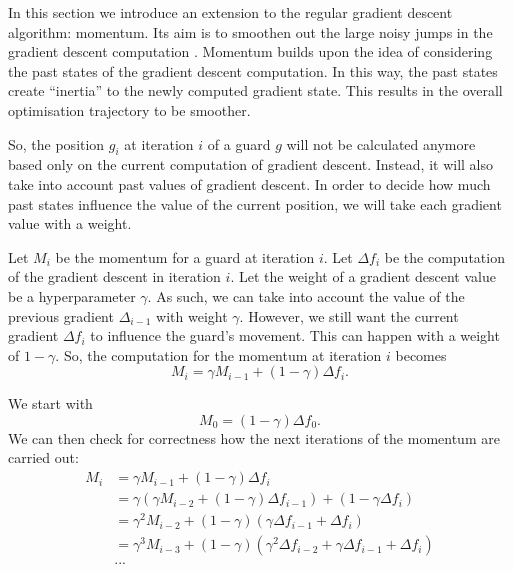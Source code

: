 In this section we introduce an extension to the regular gradient descent algorithm: momentum. Its aim is to smoothen out the large noisy jumps in the gradient descent computation \cite{goodfelow2016deep}. Momentum builds upon the idea of considering the past states of the gradient descent computation. In this way, the past states create ``inertia'' to the newly computed gradient state. This results in the overall optimisation trajectory to be smoother.

So, the position $g_i$ at iteration $i$ of a guard $g$ will not be calculated anymore based only on the current computation of gradient descent. Instead, it will also take into account past values of gradient descent. In order to decide how much past states influence the value of the current position, we will take each gradient value with a weight.

Let $M_i$ be the momentum for a guard at iteration $i$. Let $\Delta f_i$ be the computation of the gradient descent in iteration $i$. Let the weight of a gradient descent value be a hyperparameter $\gamma$. 
As such, we can take into account the value of the previous gradient $\Delta_{i - 1}$ with weight $\gamma$. However, we still want the current gradient $\Delta f_i$ to influence the guard's movement. This can happen with a weight of $1 - \gamma$. So, the computation for the momentum at iteration $i$ becomes $$M_i = \gamma M_{i - 1} + (1 - \gamma)\Delta f_i.$$

We start with $$M_0 = (1 - \gamma) \Delta f_0.$$
We can then check for correctness how  the next iterations of the momentum are carried out:
\begin{align*}
    M_i &= \gamma M_{i - 1} + (1 - \gamma) \Delta f_i \\
        &= \gamma (\gamma M_{i - 2} + (1 - \gamma) \Delta f_{i - 1}) + (1 - \gamma \Delta f_i) \\ 
        &= \gamma^2 M_{i - 2} + (1 - \gamma)(\gamma \Delta f_{i - 1} + \Delta f_i) \\
        &= \gamma^3 M_{i - 3} + (1 - \gamma)(\gamma^2 \Delta f_{i - 2} + \gamma \Delta f_{i - 1} + \Delta f_i) \\
        &...
\end{align*}

